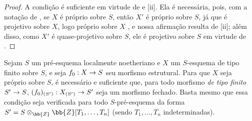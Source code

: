 \documentclass[oneside,10pt]{amsart}
\makeatletter
\newcommand{\ega@arrow}[2]{\mathchoice{#1}{#2}{#2}{#2}}
\renewcommand{\to}{\ega@arrow{\longrightarrow}{\rightarrow}}
\let\EGAOriginalLabel\label
\renewcommand{\label}[1]{\phantomsection\EGAOriginalLabel{#1}}
\makeatother
\begin{document}
\begin{proof}
A condição é suficiente em virtude de  e [ii].
Ela é necessária, pois, com a notação de , se $X$ é próprio sobre $S$, então $X'$ é próprio sobre $S$, já que é projetivo sobre $X$, logo próprio sobre $X$ , e nossa afirmação resulta de [ii]; além disso, como $X'$ é quase-projetivo sobre $S$, ele é projetivo sobre $S$ em virtude de .
\end{proof}

\begin{corollary}[5.6.3]
\label{II.5.6.3}
Sejam $S$ um pré-esquema localmente noetheriano e $X$ um $S$-esquema de tipo finito sobre $S$, e seja $f_0:X\to S$ seu morfismo estrutural.
Para que $X$ seja próprio sobre $S$, é necessário e suficiente que, para todo morfismo \emph{de tipo finito} $S'\to S$, $(f_0)_{(S')}:X_{(S')}\to S'$ seja um morfismo fechado.
Basta mesmo que essa condição seja verificada para todo $S$-pré-esquema da forma $S'=S\otimes_\bb{Z}\bb{Z}[T_1,\ldots,T_n]$ (sendo $T_1,\ldots,T_n$ indeterminadas).
\end{corollary}
\end{document}
